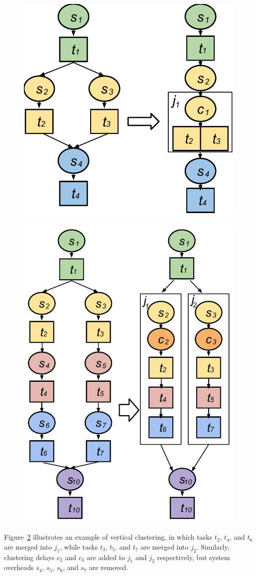 \begin{figure}[!htb]
\centering
 \includegraphics[width=0.55\linewidth]{figure3.pdf}
  \label{fig:model_hc}
\end{figure}

\begin{figure}[!htb]
\centering
 \includegraphics[width=0.6\linewidth]{figure4.pdf}
  \label{fig:model_vc}
\end{figure}

Figure~\ref{fig:model_vc} illustrates an example of vertical clustering, in which tasks $t_2$, $t_4$, and $t_6$ are merged into $j_1$, while tasks $t_3$, $t_5$, and $t_7$ are merged into $j_2$. Similarly, clustering delays $c_2$ and $c_3$ are added to $j_1$ and $j_2$ respectively, but system overheads $s_4$, $s_5$, $s_6$, and $s_7$ are removed. 



